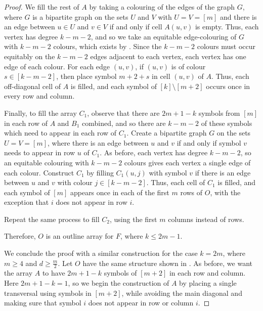 \documentclass[preprint,nonatbib]{elsarticle}
\theoremstyle{definition}
\numberwithin{equation}{section}
\begin{document}
\begin{proof}
    We fill the rest of $A$ by taking a colouring of the edges of the graph $G$, where $G$ is a bipartite graph on the sets $U$ and $V$ with $U=V=[m]$ and there is an edge between $u\in U$ and $v\in V$ if and only if cell $A(u,v)$ is empty. Thus, each vertex has degree $k-m-2$, and so we take an equitable edge-colouring of $G$ with $k-m-2$ colours, which exists by . Since the $k-m-2$ colours must occur equitably on the $k-m-2$ edges adjacent to each vertex, each vertex has one edge of each colour. For each edge $(u,v)$, if $(u,v)$ is of colour $s\in[k-m-2]$, then place symbol $m+2+s$ in cell $(u,v)$ of $A$. Thus, each off-diagonal cell of $A$ is filled, and each symbol of $[k]\setminus[m+2]$ occurs once in every row and column.

    Finally, to fill the array $C_1$, observe that there are $2m+1-k$ symbols from $[m]$ in each row of $A$ and $B_1$ combined, and so there are $k-m-2$ of these symbols which need to appear in each row of $C_1$. Create a bipartite graph $G$ on the sets $U=V=[m]$, where there is an edge between $u$ and $v$ if and only if symbol $v$ needs to appear in row $u$ of $C_1$. As before, each vertex has degree $k-m-2$, so an equitable colouring with $k-m-2$ colours gives each vertex a single edge of each colour. Construct $C_1$ by filling $C_1(u,j)$ with symbol $v$ if there is an edge between $u$ and $v$ with colour $j\in[k-m-2]$. Thus, each cell of $C_1$ is filled, and each symbol of $[m]$ appears once in each of the first $m$ rows of $O$, with the exception that $i$ does not appear in row $i$.

    Repeat the same process to fill $C_2$, using the first $m$ columns instead of rows.

    Therefore, $O$ is an outline array for $F$, where $k\leq 2m-1$.
    \vspace{0.125cm}

    We conclude the proof with a similar construction for the case $k = 2m$, where $m\geq 4$ and $d\geq \frac{m}{2}$. Let $O$ have the same structure shown in . As before, we want the array $A$ to have $2m+1-k$ symbols of $[m+2]$ in each row and column. Here $2m+1-k = 1$, so we begin the construction of $A$ by placing a single transversal using symbols in $[m+2]$, while avoiding the main diagonal and making sure that symbol $i$ does not appear in row or column $i$.
    

\end{proof}
\end{document}
